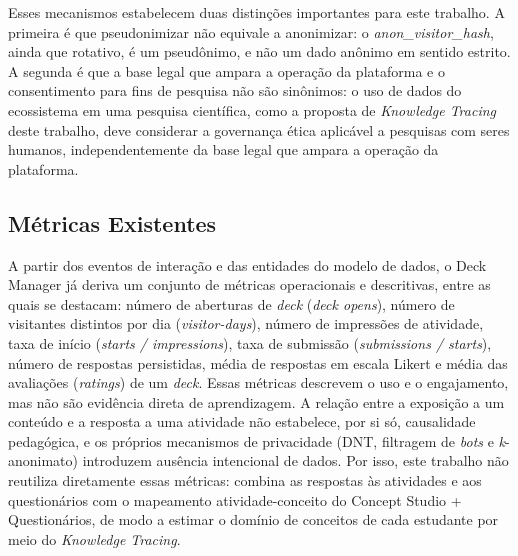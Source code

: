 Esses mecanismos estabelecem duas distinções importantes para este
trabalho. A primeira é que pseudonimizar não equivale a anonimizar: o
\textit{anon\_visitor\_hash}, ainda que rotativo, é um pseudônimo, e
não um dado anônimo em sentido estrito. A segunda é que a base legal que
ampara a operação da plataforma e o consentimento para fins de pesquisa
não são sinônimos: o uso de dados do ecossistema em uma pesquisa científica,
como a proposta de \textit{Knowledge Tracing} deste trabalho, deve
considerar a governança ética aplicável a pesquisas com seres humanos,
independentemente da base legal que ampara a operação da plataforma.

\subsection{Métricas Existentes}
\label{subsec:metricas-existentes}

A partir dos eventos de interação e das entidades do modelo de dados, o
Deck Manager já deriva um conjunto de métricas operacionais e
descritivas, entre as quais se destacam: número de aberturas de
\textit{deck} (\textit{deck opens}), número de visitantes distintos por
dia (\textit{visitor-days}), número de impressões de atividade, taxa de
início (\textit{starts / impressions}), taxa de submissão
(\textit{submissions / starts}), número de respostas persistidas, média de
respostas em escala Likert e média das avaliações (\textit{ratings}) de
um \textit{deck}. Essas métricas descrevem o uso e o engajamento, mas não
são evidência direta de aprendizagem. A relação entre a exposição a um
conteúdo e a resposta a uma atividade não estabelece, por si só,
causalidade pedagógica, e os próprios mecanismos de privacidade (DNT,
filtragem de \textit{bots} e \textit{k}-anonimato) introduzem ausência
intencional de dados. Por isso, este trabalho não reutiliza diretamente
essas métricas: combina as respostas às atividades e aos questionários com
o mapeamento atividade-conceito do Concept Studio + Questionários, de modo a estimar o domínio de conceitos de cada estudante por
meio do \textit{Knowledge Tracing}.
